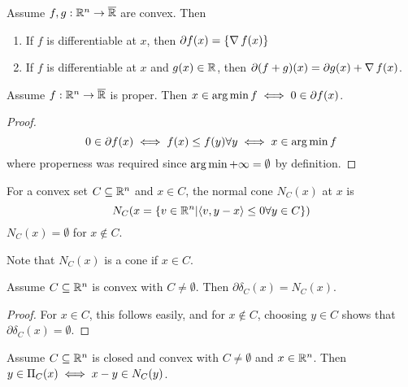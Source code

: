 \begin{thm}
  \label{sec:subgradients-3}
  Assume $f, g: \mathbb{R}^{n} \rightarrow \overline {\mathbb{R}}$ are convex.  Then
  \begin{enumerate}
  \item If $f$ is differentiable at $x$, then $\partial f(x) = \{
    \operatorname*{\nabla} f(x) \} $
  \item If $f$ is differentiable at $x$ and $g(x) \in \mathbb{R}$, then
    $\partial (f +g)(x) = \partial g(x) + \operatorname*{\nabla} f(x)$.
  \end{enumerate}
\end{thm}

\begin{thm}
  \label{sec:subgradients-4}
  Assume $f: \mathbb{R}^{n} \rightarrow \overline {\mathbb{R}}$ is proper.  Then $x \in
  \operatorname*{arg\,min} f \iff 0 \in \partial f(x)$.
\end{thm}

\begin{proof}
  \begin{equation}
    \label{eq:57}
    0 \in \partial f(x) \iff f(x) \leq f(y)\forall y \iff x \in
    \operatorname*{arg\,min} f
  \end{equation} where properness was required since $\operatorname*{arg\,min} +\infty
  = \emptyset$ by definition.
\end{proof}

\begin{defn}
  \label{sec:subgradients-5}
  For a convex set $C \subseteq \mathbb{R}^{n}$ and $x \in C$, the normal cone
  $N_{C}(x)$ at $x$ is
  \begin{equation}
    \label{eq:13}
    N_{C}(x = \{ v \in \R^{n} | \IP{v, y -x } \leq 0 \forall y \in C \} )
  \end{equation}  $N_{C}(x) = \emptyset$ for $x \notin C$.

  Note that $N_{C}(x)$ is a cone if $x \in C$.
\end{defn}

\begin{thm}
  \label{sec:subgradients-6}
  Assume $C \subseteq \mathbb{R}^{n}$ is convex with $C \neq \emptyset$.  Then
  $\partial \delta_{C}(x) = N_{C}(x)$.
\end{thm}

\begin{proof}
  For $x \in C$, this follows easily, and for $x \notin C$, choosing
  $y \in C$ shows that $\partial \delta_{C}(x) = \emptyset$.
\end{proof}

\begin{thm}
  \label{sec:subgradients-7}
  Assume $C \subseteq \mathbb{R}^{n}$ is closed and convex with $C \neq
  \emptyset$ and $x \in \mathbb{R}^{n}$.  Then $y \in \operatorname*{\Pi}_{C}(x) \iff x - y
  \in N_{C}(y)$.
\end{thm}

